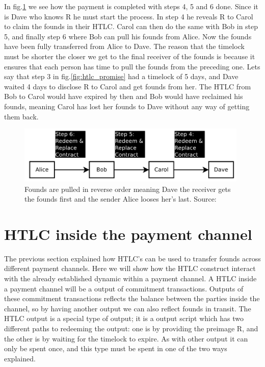 \documentclass[informationsecurity]{gucmasterproject}
\begin{document}
In fig.\ref{fig:htlc_settle} we see how the payment is completed with steps 4, 5 and 6 done. Since it is Dave who knows R he must start the process. In step 4 he reveals R to Carol to claim the founds in their HTLC. Carol can then do the same with Bob in step 5, and finally step 6 where Bob can pull his founds from Alice.
Now the founds have been fully transferred from Alice to Dave.
The reason that the timelock must be shorter the closer we get to the final receiver of the founds is because it ensures that each person has time to pull the founds from the preceding one. Lets say that step 3 in fig.\ref{fig:htlc_promise} had a timelock of 5 days, and Dave waited 4 days to disclose R to Carol and get founds from her. The HTLC from Bob to Carol would have expired by then and Bob would have reclaimed his founds, meaning Carol has lost her founds to Dave without any way of getting them back.

\begin{figure}[h]
    \centering
    \includegraphics[width=11cm]{figs/htlc_settle.png}
    \caption{ Founds are pulled in reverse order meaning Dave the receiver gets the founds first and the sender Alice looses her's last. Source: \cite{poon2015bitcoin}}
    \label{fig:htlc_settle}
\end{figure}


\section{HTLC inside the payment channel}
The previous section explained how HTLC's can be used to transfer founds across different payment channels.
Here we will show how the HTLC construct interact with the already established dynamic within a payment channel.
A HTLC inside a payment channel will be a output of commitment transactions. Outputs of these commitment transactions reflects the balance between the parties inside the channel, so by having another output we can also reflect founds in transit. The HTLC output is a special type of output; it is a output script which has two different paths to redeeming the output: one is by providing the preimage R, and the other is by waiting for the timelock to expire. As with other output it can only be spent once, and this type must be spent in one of the two ways explained.
\end{document}
